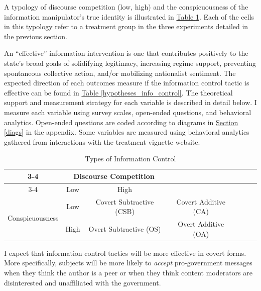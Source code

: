 \documentclass[11pt]{article}
\begin{document}
A typology of discourse competition (low, high) and the conspicuousness of the information manipulator's true identity is illustrated in \hyperref[types_info_control]{Table \ref*{types_info_control}}. Each of the cells in this typology refer to a treatment group in the three experiments detailed in the previous section.


An ``effective'' information intervention is one that contributes positively to the state's broad goals of solidifying legitimacy, increasing regime support, preventing spontaneous collective action, and/or mobilizing nationalist sentiment. The expected direction of each outcomes measure if the information control tactic is effective can be found in \hyperref[hypotheses_info_control]{Table \ref*{hypotheses_info_control}}. The theoretical support and measurement strategy for each variable is described in detail below. I measure each variable using survey scales, open-ended questions, and behavioral analytics. Open-ended questions are coded according to diagrams in \hyperref[diags]{Section \ref*{diags}} in the appendix. Some variables are measured using behavioral analytics gathered from interactions with the treatment vignette website.

\begin{table}[h]
    \centering
    \caption{Types of Information Control}
    \label{types_info_control}
        \begin{tabular}{|c|c|c|c|c|c|c|}
            \cline{3-4}
            \multicolumn{2}{p{.01\textwidth}p{.01\textwidth}|}{} & \multicolumn{2}{c|}{Discourse Competition}  \\ \cline{3-4}
            \multicolumn{2}{p{.01\textwidth}p{.01\textwidth}|}{} & Low & High \\ \hline
            \multirow{2}{*}{Conspicuousness} & Low & Covert Subtractive (CSB) & Covert Additive (CA) \\  \cline{2-4}
            & High & Overt Subtractive (OS) & Overt Additive (OA) \\ \hline
        \end{tabular}
\end{table}

I expect that information control tactics will be more effective in covert forms. More specifically, subjects will be more likely to {\it accept} pro-government messages when they think the author is a peer or when they think content moderators are disinterested and unaffiliated with the government.\newline
\end{document}
